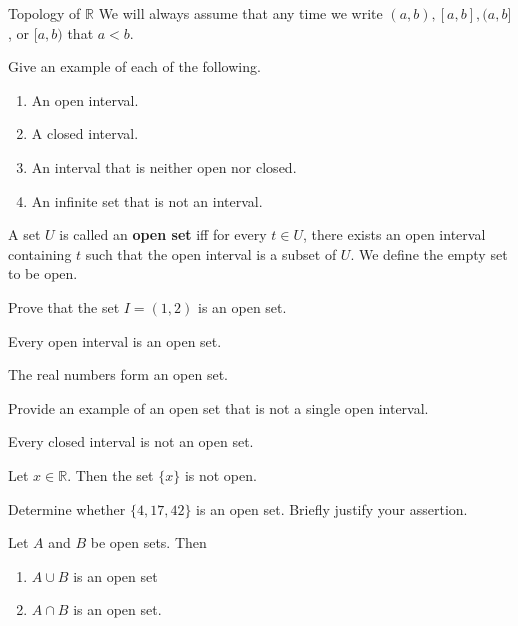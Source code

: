 \begin{section}{Topology of $\mathbb{R}$}
We will always assume that any time we write $(a,b), [a,b], (a,b]$, or $[a,b)$ that $a<b$. 

\begin{exercise} Give an example of each of the following.
\begin{enumerate}[label=\textrm{(\alph*)}]
\item An open interval.
\item A closed interval.
\item An interval that is neither open nor closed.
\item An infinite set that is not an interval.
\end{enumerate}
\end{exercise}

\begin{definition}
A set $U$ is called an \textbf{open set} iff for every $t \in U$, there exists an open interval containing $t$ such that the open interval is a subset of $U$.  We define the empty set to be open.\end{definition}

\begin{problem} 
Prove that the set $I=(1,2)$ is an open set.
\end{problem}

\begin{theorem}
Every open interval is an open set. 
\end{theorem}

\begin{theorem}
The real numbers form an open set.
\end{theorem}

\begin{exercise}
Provide an example of an open set that is not a single open interval.
\end{exercise}

\begin{theorem}
Every closed interval is not an open set.
\end{theorem}

\begin{theorem}
Let $x\in\mathbb{R}$.  Then the set $\{x\}$ is not open.
\end{theorem}

\begin{exercise} 
Determine whether $\{4,17,42\}$ is an open set. Briefly justify your assertion. 
\end{exercise}

\begin{theorem}\label{finite union of open sets}
Let $A$ and $B$ be open sets.  Then 
\begin{enumerate}[label=\textrm{(\alph*)}]
\item $A\cup B$ is an open set
\item $A\cap B$ is an open set.
\end{enumerate}
\end{theorem}


\end{section}
